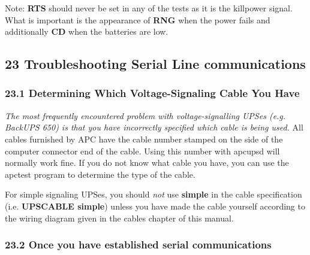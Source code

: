 Note: {\bf RTS} should never be set in any of the tests as it is the killpower
signal. What is important is the appearance of {\bf RNG} when the power fails
and additionally {\bf CD} when the batteries are low. 

\label{Troubleshooting-Serial-Line-communications}

\subsection*{23 Troubleshooting Serial Line communications}

\label{index-Problems_002c-Serial-228}
\label{index-Serial-Problems-229}

\label{Determining-Which-Voltage_002dSignaling-Cable-You-Have}

\subsubsection*{23.1 Determining Which Voltage-Signaling Cable You Have}

{\it The most frequently encountered problem with voltage-signalling UPSes
(e.g. BackUPS 650) is that you have incorrectly specified which cable is being
used.} All cables furnished by APC have the cable number stamped on the side
of the computer connector end of the cable. Using this number with apcupsd
will normally work fine. If you do not know what cable you have, you can use
the apctest program to determine the type of the cable.  

For simple signaling UPSes, you should {\it not} use {\bf simple} in the cable
specification (i.e. {\bf UPSCABLE simple}) unless you have made the cable
yourself according to the wiring diagram given in the cables chapter of this
manual. 

\label{Once-you-have-established-serial-communications}

\subsubsection*{23.2 Once you have established serial communications}

